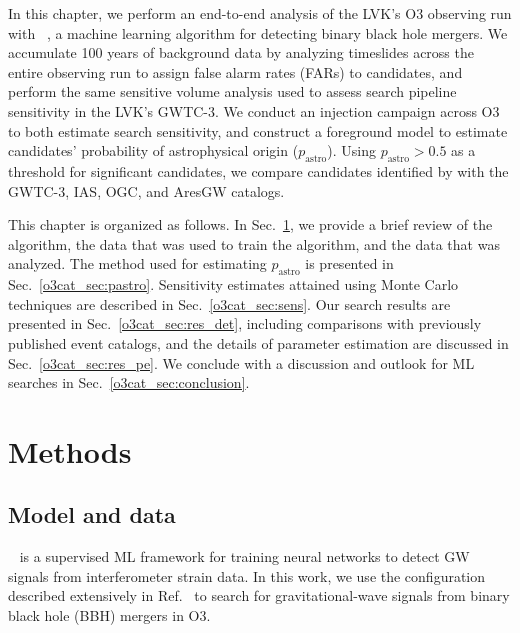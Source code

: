 \begin{refsection}
In this chapter, we perform an end-to-end analysis of the LVK's O3 observing run with \aframe~\cite{aframe-methods}, a machine learning algorithm for detecting binary black hole mergers. 
We accumulate 100 years of background data by analyzing timeslides across the entire observing run to assign false alarm rates (FARs) to candidates, and perform the same sensitive volume analysis used to assess search pipeline sensitivity in the LVK's GWTC-3. 
We conduct an injection campaign across O3 to both estimate search sensitivity, and construct a foreground model to estimate candidates' probability of astrophysical origin ($p_\mathrm{astro}$). 
Using $p_\mathrm{astro} > 0.5$ as a threshold for significant candidates, we compare candidates identified by \aframe with the GWTC-3, IAS, OGC, and AresGW catalogs. 

This chapter is organized as follows.
In Sec.~\ref{o3cat_sec:methods}, we provide a brief review of the \aframe algorithm, the data that was used to train the algorithm, and the data that was analyzed. The method used for estimating $p_{\mathrm{astro}}$ is presented in Sec.~\ref{o3cat_sec:pastro}.
Sensitivity estimates attained using Monte Carlo techniques are described in Sec.~\ref{o3cat_sec:sens}.
Our search results are presented in Sec.~\ref{o3cat_sec:res_det}, including comparisons with previously published event catalogs, and the details of parameter estimation are discussed in Sec.~\ref{o3cat_sec:res_pe}.
We conclude with a discussion and outlook for ML searches in Sec.~\ref{o3cat_sec:conclusion}.

\section{Methods}
\label{o3cat_sec:methods}

\subsection{Model and data}
\label{o3cat_sec:model}

\aframe~\cite{Marx_aframe} is a supervised ML framework for training neural networks to detect GW signals from interferometer strain data. 
In this work, we use the \aframe configuration described extensively in Ref.~\cite{aframe-methods} to search for gravitational-wave signals from binary black hole (BBH) mergers in O3. 


\end{refsection}
